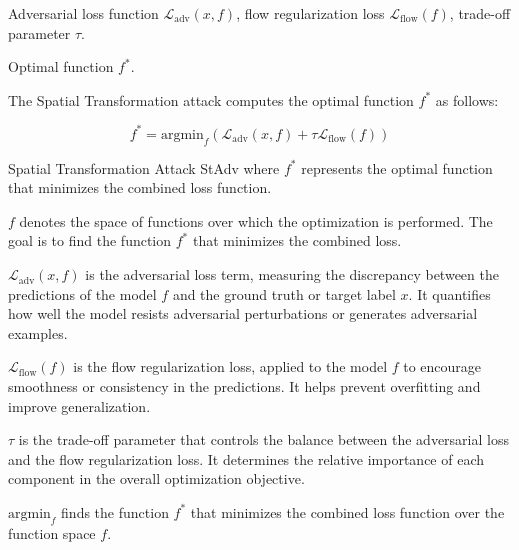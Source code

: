 Adversarial loss function $\mathcal{L}_{\text{adv}}(x, f)$, flow regularization loss $\mathcal{L}_{\text{flow}}(f)$, trade-off parameter $\tau$.

Optimal function $f^*$.

The Spatial Transformation attack computes the optimal function $f^*$ as follows:

\[
f^* = \text{argmin}_f \left( \mathcal{L}_{\text{adv}}(x, f) + \tau \mathcal{L}_{\text{flow}}(f) \right)
\]

Spatial Transformation Attack StAdv where $f^*$ represents the optimal function that minimizes the combined loss function.

$f$ denotes the space of functions over which the optimization is performed. The goal is to find the function $f^*$ that minimizes the combined loss.

$\mathcal{L}_{\text{adv}}(x, f)$ is the adversarial loss term, measuring the discrepancy between the predictions of the model $f$ and the ground truth or target label $x$. It quantifies how well the model resists adversarial perturbations or generates adversarial examples.

$\mathcal{L}_{\text{flow}}(f)$ is the flow regularization loss, applied to the model $f$ to encourage smoothness or consistency in the predictions. It helps prevent overfitting and improve generalization.

$\tau$ is the trade-off parameter that controls the balance between the adversarial loss and the flow regularization loss. It determines the relative importance of each component in the overall optimization objective.

$\text{argmin}_f$ finds the function $f^*$ that minimizes the combined loss function over the function space $f$.
